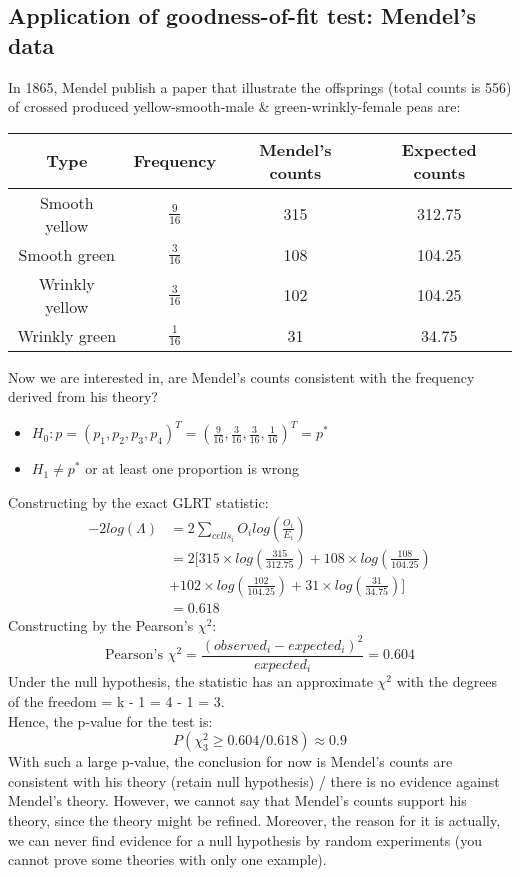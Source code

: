 \documentclass[12pt ]{article}
\begin{document}
\subsection{Application of goodness-of-fit test: Mendel's data}
In 1865, Mendel publish a paper that illustrate the offsprings (total counts is 556) of crossed produced yellow-smooth-male \& green-wrinkly-female peas are:
\begin{center}
\begin{tabular}{||c | c | c | c||} 
 \hline
 Type & Frequency & Mendel's counts & Expected counts\\ [0.5ex] 
 \hline\hline
 Smooth yellow & $\frac{9}{16}$ & 315 & 312.75 \\ 
 Smooth green & $\frac{3}{16}$ & 108 & 104.25\\  
 Wrinkly yellow & $\frac{3}{16}$ & 102 & 104.25\\
 Wrinkly green & $\frac{1}{16}$ & 31 & 34.75\\
 \hline
\end{tabular}
\end{center}
Now we are interested in, are Mendel's counts consistent with the frequency derived from his theory?\\
\begin{itemize}
\item $H_{0}: p = (p_{1}, p_{2}, p_{3}, p_{4})^T = (\frac{9}{16}, \frac{3}{16}, \frac{3}{16}, \frac{1}{16})^T = p^*$
\item $H_{1} \neq p^*$ or at least one proportion is wrong
\end{itemize}
Constructing by the exact GLRT statistic:
\begin{align*}
-2log(\Lambda) &= 2\sum_{cells_{i}} O_{i} log(\frac{O_{i}}{E_{i}}) \\
&= 2[315 \times log(\frac{315}{312.75}) + 108 \times log(\frac{108}{104.25}) \\
&+ 102 \times log(\frac{102}{104.25}) + 31 \times log(\frac{31}{34.75})] \\
& = 0.618
\end{align*}
Constructing by the Pearson's $\chi^2$:
\begin{equation*}
\text{Pearson's $\chi^2$} = \frac{(observed_{i} - expected_{i})^2}{expected_{i}} = 0.604
\end{equation*}
Under the null hypothesis, the statistic has an approximate $\chi^2$ with the degrees of the freedom = k - 1 = 4 - 1 = 3. \\
Hence, the p-value for the test is:
\begin{equation*}
P(\chi^2_{3} \geq 0.604 / 0.618) \approx 0.9
\end{equation*}
With such a large p-value, the conclusion for now is Mendel's counts are consistent with his theory (retain null hypothesis) / there is no evidence against Mendel's theory. However, we cannot say that Mendel's counts support his theory, since the theory might be refined. Moreover, the reason for it is actually, we can never find evidence for a null hypothesis by random experiments (you cannot prove some theories with only one example). \\
\end{document}
